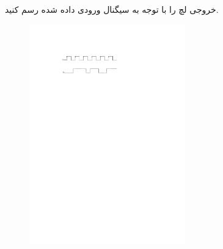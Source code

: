 
خروجی  لچ  را با توجه به سیگنال ورودی داده شده رسم کنید.

\begin{figure}[h]
	\centering
	\includegraphics[width=0.6\textwidth]{fig/Q_opt2.pdf}
	\label{fig:Q_opt_2}
\end{figure}
